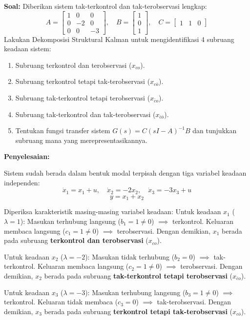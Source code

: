\documentclass[11pt,a4paper]{article}
\begin{document}
\textbf{Soal:}  
Diberikan sistem tak-terkontrol dan tak-terobservasi lengkap:
$$A = \begin{bmatrix} 1 & 0 & 0 \\ 0 & -2 & 0 \\ 0 & 0 & -3 \end{bmatrix}, \quad B = \begin{bmatrix} 1 \\ 0 \\ 1 \end{bmatrix}, \quad C = \begin{bmatrix} 1 & 1 & 0 \end{bmatrix}$$
Lakukan Dekomposisi Struktural Kalman untuk mengidentifikasi 4 subruang keadaan sistem:
\begin{enumerate}[label=(\alph*)]
    \item Subruang terkontrol dan terobservasi ($x_{co}$).
    \item Subruang terkontrol tetapi tak-terobservasi ($x_{c\bar{o}}$).
    \item Subruang tak-terkontrol tetapi terobservasi ($x_{\bar{c}o}$).
    \item Subruang tak-terkontrol dan tak-terobservasi ($x_{\bar{c}\bar{o}}$).
    \item Tentukan fungsi transfer sistem $G(s) = C(sI - A)^{-1} B$ dan tunjukkan subruang mana yang merepresentasikannya.
\end{enumerate}

\textbf{Penyelesaian:}

Sistem sudah berada dalam bentuk modal terpisah dengan tiga variabel keadaan independen:
$$\dot{x}_1 = x_1 + u, \quad \dot{x}_2 = -2x_2, \quad \dot{x}_3 = -3x_3 + u$$
$$y = x_1 + x_2$$

Diperiksa karakteristik masing-masing variabel keadaan:
Untuk keadaan $x_1$ ($\lambda = 1$):
Masukan terhubung langsung ($b_1 = 1 \ne 0$) $\implies$ terkontrol.
Keluaran membaca langsung ($c_1 = 1 \ne 0$) $\implies$ terobservasi.
Dengan demikian, $x_1$ berada pada subruang \textbf{terkontrol dan terobservasi} ($x_{co}$).

Untuk keadaan $x_2$ ($\lambda = -2$):
Masukan tidak terhubung ($b_2 = 0$) $\implies$ tak-terkontrol.
Keluaran membaca langsung ($c_2 = 1 \ne 0$) $\implies$ terobservasi.
Dengan demikian, $x_2$ berada pada subruang \textbf{tak-terkontrol tetapi terobservasi} ($x_{\bar{c}o}$).

Untuk keadaan $x_3$ ($\lambda = -3$):
Masukan terhubung langsung ($b_3 = 1 \ne 0$) $\implies$ terkontrol.
Keluaran tidak membaca ($c_3 = 0$) $\implies$ tak-terobservasi.
Dengan demikian, $x_3$ berada pada subruang \textbf{terkontrol tetapi tak-terobservasi} ($x_{c\bar{o}}$).
\end{document}
